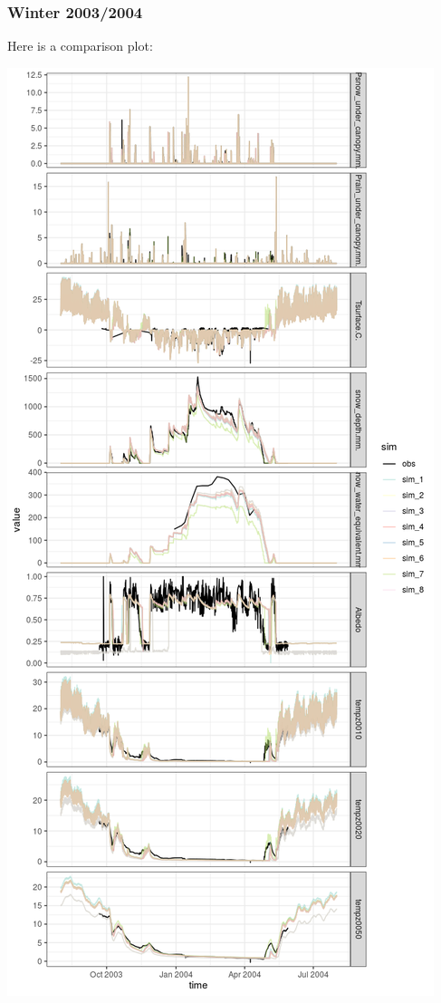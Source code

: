 \documentclass[
]{article}
\begin{document}
\hypertarget{winter-20032004}{%
\subsubsection{Winter 2003/2004}\label{winter-20032004}}

Here is a comparison plot:

\includegraphics{coldelaporte_v6_files/figure-latex/Winter_2003_2004-1.png}
\end{document}
